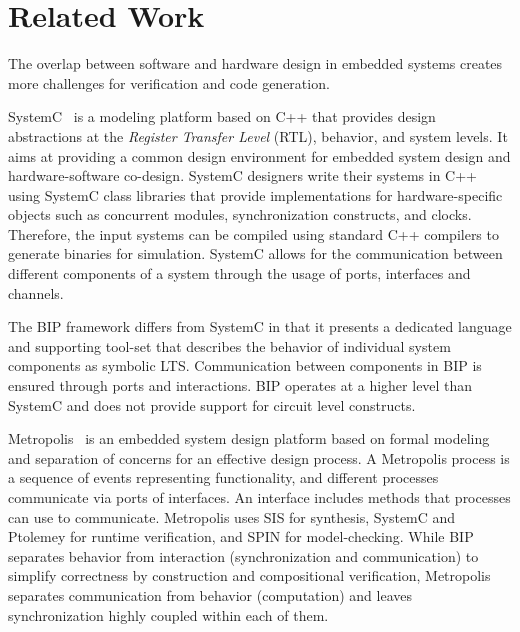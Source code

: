 \section{Related Work}
\label{sec:related}
%
The overlap between software and hardware design in embedded systems creates more challenges 
for verification and code generation. 

SystemC~\cite{systemc} is a modeling platform based on C++ that provides
design abstractions at the {\em Register Transfer Level} (RTL), behavior, and system levels. 
It aims at providing a common design environment for embedded system design and hardware-software
co-design. SystemC designers write their systems in C++ using SystemC class libraries that 
provide implementations for hardware-specific objects such as concurrent modules, synchronization constructs,
and clocks.
Therefore, the input systems can be compiled using standard C++ compilers to generate binaries
for simulation. SystemC allows for the communication between different components of a system
through the usage of ports, interfaces and channels.  

The BIP framework differs from SystemC in that it presents a dedicated language and supporting
tool-set that describes the behavior of individual system components as symbolic LTS. 
Communication between components in BIP is ensured through ports and interactions.   
BIP operates at a higher level than SystemC and does not provide support for circuit level 
constructs.

Metropolis~\cite{metropolis1,metropolis2} is an embedded system design platform based on 
formal modeling and separation of concerns for an effective
design process.
%
A Metropolis process is a sequence of events representing
functionality, and different processes communicate via ports of interfaces.
%
An interface includes methods that processes can use to communicate. 
Metropolis uses SIS for synthesis, SystemC and Ptolemey for runtime verification, and SPIN for model-checking.
While BIP separates behavior from interaction (synchronization and communication) to simplify correctness by construction
and compositional verification, Metropolis separates communication from behavior (computation) and leaves synchronization 
highly coupled within each of them. 




